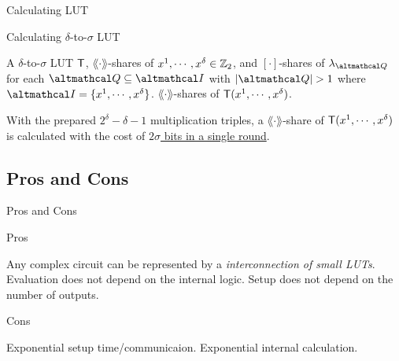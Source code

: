 \documentclass[../240906_cryptlab_flute.tex]{subfiles}
\begin{document}
\begin{frame}{Calculating LUT}
    \begin{block}{Calculating \(\delta\)-to-\(\sigma\) LUT}
        \begin{description}[Output]
            \ii[Input]
            A \(\delta\)-to-\(\sigma\) LUT \(\mathsf{T}\),
            \(\lang\cdot\rang\)-shares of \(x^1, \cdots, x^\delta \in \mathbb{Z}_2\), and
            \([\cdot]\)-shares of \(\lambda_{\mcal{Q}}\) for each \(\mcal{Q} \subseteq \mcal{I}\)
            with \(|\mcal{Q}| > 1\) where \(\mcal{I} = \{x^1,\cdots,x^\delta\}\).
            \ii[Output]
            \(\lang\cdot\rang\)-shares of \(\mathsf{T}(x^1, \cdots, x^\delta)\).
        \end{description}
        With the prepared \(2^\delta - \delta - 1\) multiplication triples,
        a \(\lang\cdot\rang\)-share of \(\mathsf{T}(x^1, \cdots, x^\delta)\)
        is calculated with the cost of \ul{\(2\sigma\) bits in a single round}.
    \end{block}
\end{frame}

\subsection{Pros and Cons}
\begin{frame}{Pros and Cons}
    \begin{block}{Pros}
        \begin{itemize}
            \ii Any complex circuit can be represented by a \emph{interconnection of small LUTs}.
            \ii Evaluation does not depend on the internal logic.
            \ii Setup does not depend on the number of outputs.
        \end{itemize}
    \end{block}
    \pause
    \begin{block}{Cons}
        \begin{itemize}
            \ii Exponential setup time/communicaion.
            \ii Exponential internal calculation.
        \end{itemize}
    \end{block}
\end{frame}
\end{document}

